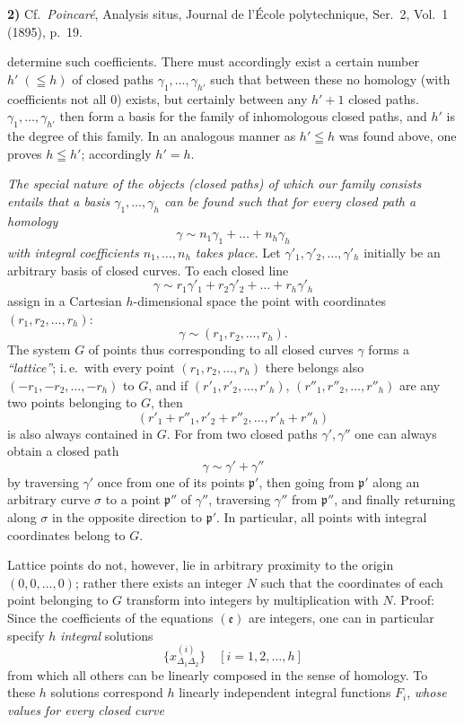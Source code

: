 \documentclass{article}
\begin{document}
\textbf{2)} Cf.\ \emph{Poincaré}, Analysis situs, Journal de l'École polytechnique, Ser.\ 2, Vol.\ 1 (1895), p.~19.

determine such coefficients. There must accordingly exist a certain number $h' \; (\leqq h)$ of closed paths $\gamma_1, \dots, \gamma_{h'}$ such that between these no homology (with coefficients not all $0$) exists, but certainly between any $h' + 1$ closed paths. $\gamma_1, \dots, \gamma_{h'}$ then form a basis for the family of inhomologous closed paths, and $h'$ is the degree of this family. In an analogous manner as $h' \leqq h$ was found above, one proves $h \leqq h'$; accordingly $h' = h$.

\emph{The special nature of the objects (closed paths) of which our family consists entails that a basis $\gamma_1, \dots, \gamma_h$ can be found such that for every closed path a homology}
\[ \gamma \sim n_1 \gamma_1 + \dots + n_h \gamma_h \]
\emph{with integral coefficients $n_1, \dots, n_h$ takes place.} Let $\gamma'_1, \gamma'_2, \dots, \gamma'_h$ initially be an arbitrary basis of closed curves. To each closed line
\[ \gamma \sim r_1 \gamma'_1 + r_2 \gamma'_2 + \dots + r_h \gamma'_h \]
assign in a Cartesian $h$-dimensional space the point with coordinates $(r_1, r_2, \dots, r_h)$:
\[ \gamma \sim (r_1, r_2, \dots, r_h). \]
The system $G$ of points thus corresponding to all closed curves $\gamma$ forms a \emph{``lattice''}; i.\,e.\ with every point $(r_1, r_2, \dots, r_h)$ there belongs also $(-r_1, -r_2, \dots, -r_h)$ to $G$, and if $(r'_1, r'_2, \dots, r'_h)$, $(r''_1, r''_2, \dots, r''_h)$ are any two points belonging to $G$, then
\[ (r'_1 + r''_1, r'_2 + r''_2, \dots, r'_h + r''_h) \]
is also always contained in $G$. For from two closed paths $\gamma', \gamma''$ one can always obtain a closed path
\[ \gamma \sim \gamma' + \gamma'' \]
by traversing $\gamma'$ once from one of its points $\mathfrak{p}'$, then going from $\mathfrak{p}'$ along an arbitrary curve $\sigma$ to a point $\mathfrak{p}''$ of $\gamma''$, traversing $\gamma''$ from $\mathfrak{p}''$, and finally returning along $\sigma$ in the opposite direction to $\mathfrak{p}'$. In particular, all points with integral coordinates belong to $G$.

Lattice points do not, however, lie in arbitrary proximity to the origin $(0, 0, \dots, 0)$; rather there exists an integer $N$ such that the coordinates of each point belonging to $G$ transform into integers by multiplication with $N$. Proof: Since the coefficients of the equations $(\mathfrak{e})$ are integers, one can in particular specify $h$ \emph{integral} solutions
\[ \{ x_{\Delta_1 \Delta_2}^{(i)} \} \quad [i = 1, 2, \dots, h] \]
from which all others can be linearly composed in the sense of homology. To these $h$ solutions correspond $h$ linearly independent integral functions $F_i$, \emph{whose values for every closed curve}
\end{document}
